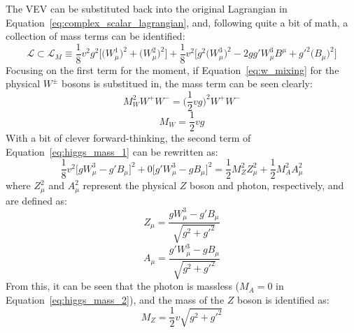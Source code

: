 The VEV can be substituted back into the original Lagrangian in Equation~\ref{eq:complex_scalar_lagrangian}, and, following quite a bit of math, a collection of mass terms can be identified:
\begin{equation}
  \mathcal{L} \subset \mathcal{L}_M \equiv \frac{1}{8}v^{2}g^{2}\bigg[\big(W_{\mu}^1\big)^2 + \big(W_{\mu}^2\big)^2\bigg] + \frac{1}{8}v^2\bigg[g^{2}\big(W_{\mu}^3\big)^2 - 2gg'W_{\mu}^{3}B^{\mu} + g'^{2}\big(B_{\mu}\big)^{2}\bigg]
  \label{eq:higgs_mass_1}
\end{equation}
Focusing on the first term for the moment, if Equation~\ref{eq:w_mixing} for the physical $W^\pm$ bosons is substitued in, the mass term can be seen clearly:
\begin{equation}
  M_W^{2}W^{+}W^{-} = \bigg(\frac{1}{2}vg\bigg)^{2}W^{+}W^{-}
\end{equation}
\begin{equation}
  M_W = \frac{1}{2}vg
\end{equation}
With a bit of clever forward-thinking, the second term of Equation~\ref{eq:higgs_mass_1} can be rewritten as:
\begin{equation}
  \frac{1}{8}v^{2}\bigg[gW_{\mu}^{3} - g'B_{\mu}\bigg]^2 + 0\bigg[g'W_{\mu}^{3} - gB_{\mu}\bigg]^2 =  \frac{1}{2}M_{Z}^{2}Z_{\mu}^{2} + \frac{1}{2}M_{A}^{2}A_{\mu}^{2}
  \label{eq:higgs_mass_2}
\end{equation}
where $Z_{\mu}^{2}$ and $A_{\mu}^2$ represent the physical $Z$ boson and photon, respectively, and are defined as:
\begin{equation}
 Z_{\mu} = \frac{gW_{\mu}^{3} - g'B_{\mu}}{\sqrt{g^2+g'^2}}
  \label{eq:higgs_z}
\end{equation}
\begin{equation}
  A_{\mu} = \frac{g'W_{\mu}^{3} - gB_{\mu}}{\sqrt{g^2+g'^2}}
  \label{eq:higgs_a}
\end{equation}
From this, it can be seen that the photon is massless ($M_A = 0$ in Equation~\ref{eq:higgs_mass_2}), and the mass of the $Z$ boson is identified as:
\begin{equation}
  M_Z = \frac{1}{2}v\sqrt{g^2+g'^2}
\end{equation}

